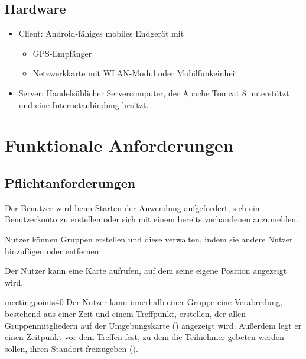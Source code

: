 \documentclass[parskip=full,11pt]{scrartcl}
\begin{document}
\subsection{Hardware}
\begin{itemize}
    \item Client: Android-fähiges mobiles Endgerät mit
        \begin{itemize}
            \item GPS-Empfänger
            \item Netzwerkkarte mit WLAN-Modul oder Mobilfunkeinheit
        \end{itemize}
    \item Server: Handelsüblicher Servercomputer, der Apache Tomcat 8
        unterstützt und eine Internetanbindung besitzt.
\end{itemize}

\pagebreak
\section{Funktionale Anforderungen}

\subsection{Pflichtanforderungen}

%
Der Benutzer wird beim Starten der Anwendung aufgefordert, sich ein
Benutzerkonto zu erstellen oder sich mit einem bereits vorhandenen anzumelden.

%
Nutzer können Gruppen erstellen und diese verwalten, indem sie andere Nutzer
hinzufügen oder entfernen.

%
Der Nutzer kann eine Karte aufrufen, auf dem seine eigene Position angezeigt
wird.

    {meetingpoints}{40}
%
Der Nutzer kann innerhalb einer Gruppe eine Verabredung, bestehend aus einer
Zeit und einem Treffpunkt, erstellen, der allen Gruppenmitgliedern auf der
Umgebungskarte () angezeigt wird.
Außerdem legt er einen Zeitpunkt vor dem Treffen fest,
zu dem die Teilnehmer gebeten werden sollen,
ihren Standort freizugeben ().
\end{document}
